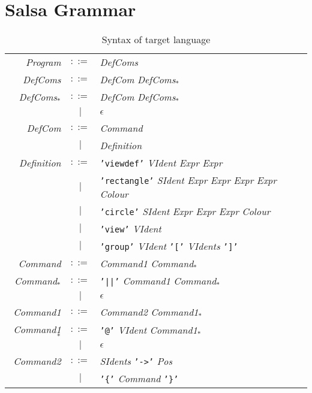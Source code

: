 \documentclass[
paper=a4,
oneside,
fontsize=11pt,
numbers=noenddot,
headinclude=false, %
footinclude=false, %
fleqn,             %
DIV=8
]{scrartcl}
\begin{document}
\appendix

\section{Salsa Grammar}

\begin{table}[h]
  \centering\regnum
  \caption{Syntax of target language}\label{grammar}
  \begin{tabularx}{\textwidth}{rcX} \toprule
    {\em Program}    & $::=$ & {\em DefComs}\\
    {\em DefComs}    & $::=$ & {\em DefCom} {\em DefComs$_{*}$}\\
    {\em DefComs$_{*}$}   & $::=$ & {\em DefCom} {\em DefComs$_{*}$}\\
               & $|$   & $\epsilon$\\
    {\em DefCom}     & $::=$ & {\em Command}\\
               & $|$   & {\em Definition}\\
    {\em Definition} & $::=$ & {\tt 'viewdef'} {\em VIdent} {\em Expr} {\em Expr}\\
               & $|$   & {\tt 'rectangle'} {\em SIdent} {\em Expr} {\em Expr} {\em Expr} {\em Expr} {\em Colour}\\
               & $|$   & {\tt 'circle'} {\em SIdent} {\em Expr} {\em Expr} {\em Expr} {\em Colour}\\
               & $|$   & {\tt 'view'} {\em VIdent}\\
               & $|$   & {\tt 'group'} {\em VIdent} {\tt '['} {\em VIdents} {\tt ']'}\\
    {\em Command}    & $::=$ & {\em Command1} {\em Command$_{*}$}\\
    {\em Command$_{*}$}    & $::=$ & {\tt '||'} {\em Command1} {\em Command$_{*}$}\\
               & $|$ & $\epsilon$ \\
    {\em Command1}    & $::=$ & {\em Command2} {\em Command1$_{*}$}\\
    {\em Command1$_{*}$}    & $::=$ & {\tt '@'} {\em VIdent} {\em Command1$_{*}$}\\
               & $|$ & $\epsilon$ \\
    {\em Command2}    & $::=$ & {\em SIdents} {\tt '->'} {\em Pos}\\
               & $|$   & {\tt '\{'} {\em Command} {\tt '\}'}\\


\end{tabularx}
\end{table}
\end{document}
